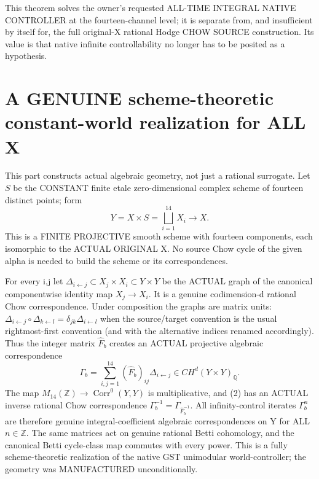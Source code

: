 \documentclass[11pt]{article}
\begin{document}
This theorem solves the owner's requested
ALL-TIME INTEGRAL NATIVE CONTROLLER
at the fourteen-channel level; it is
separate from, and insufficient by itself
for, the full original-X rational Hodge
CHOW SOURCE construction. Its value is
that native infinite controllability
no longer has to be posited as a hypothesis.

\section{A GENUINE scheme-theoretic constant-world realization for ALL X}
This part constructs actual algebraic geometry,
not just a rational surrogate.
Let \(S\) be the CONSTANT finite etale
zero-dimensional complex scheme of fourteen
distinct points; form
\[
\boxed{
Y=X\times S=\bigsqcup_{i=1}^{14}X_i
\longrightarrow X.
}
\]
This is a FINITE PROJECTIVE smooth scheme
with fourteen components, each isomorphic
to the ACTUAL ORIGINAL X.
No source Chow cycle of the given alpha
is needed to build the scheme or its
correspondences.

For every i,j let
\(\Delta_{i\leftarrow j}\subset
X_j\times X_i\subset Y\times Y\)
be the ACTUAL graph of the canonical
componentwise identity map \(X_j\to X_i\).
It is a genuine codimension-d rational
Chow correspondence.
Under composition the graphs are
matrix units:
\(\Delta_{i\leftarrow j}\circ
\Delta_{k\leftarrow l}
=\delta_{jk}\Delta_{i\leftarrow l}\)
when the source/target convention
is the usual rightmost-first convention
(and with the alternative indices
renamed accordingly).
Thus the integer matrix \(\widehat F_b\)
creates an ACTUAL projective algebraic
correspondence
\[
\boxed{
\Gamma_b=
\sum_{i,j=1}^{14}
(\widehat F_b)_{ij}\Delta_{i\leftarrow j}
\in CH^d(Y\times Y)_{\mathbb Q}.
}\tag{2}
\]
The map \(M_{14}(\mathbb Z)\to
\operatorname{Corr}^0(Y,Y)\)
is multiplicative, and (2) has an ACTUAL
inverse rational Chow correspondence
\(\Gamma_b^{-1}=\Gamma_{\widehat F_b^{-1}}\).
All infinity-control iterates
\(\Gamma_b^n\) are therefore genuine
integral-coefficient algebraic
correspondences on Y for ALL \(n\in\mathbb Z\).
The same matrices act on
genuine rational Betti cohomology,
and the canonical Betti cycle-class
map commutes with every power.
This is a fully scheme-theoretic
realization of the native GST
unimodular world-controller; the
geometry was MANUFACTURED unconditionally.
\end{document}
